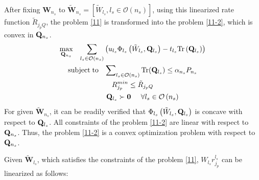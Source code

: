 \documentclass[12pt,onecolumn,tworows]{IEEEtran}
\begin{document}
After fixing $\mathbf{W}_{n_s}$ to $\mathbf{\tilde W}_{n_s} = [\tilde W_{l_s},l_s\in\mathcal{O}(n_s)]$, using this linearized rate function ${{\tilde R}_{{j_pQ}}}$, the problem \eqref{11} is transformed into the problem \eqref{11-2}, which is convex in ${\bf{Q}}_{{n_s}}$.
\begin{equation}\label{11-2}
\begin{gathered}
{\max _{{{\bf{Q}}_{{n_s}}}}}\;\;\;\sum\limits_{{l_s} \in {\cal O}\left( {{n_s}} \right)} {\left( {{u_{{l_s}}}{\Phi _{{l_s}}}\left( {{{{{\tilde W}}}_{{l_s}}},{{\bf{Q}}_{{l_s}}}} \right) - {t_{{l_s}}}{\rm{Tr}}\left( {{{\bf{Q}}_{{l_s}}}} \right)} \right)} \\
{\rm{subject}}\;{\rm{to}}\;\;\;\sum\nolimits_{{l_s} \in {\cal O}\left( {{n_s}} \right)} {{\rm{Tr}}({{\bf{Q}}_{{l_s}}})}  \le {\alpha _{{n_s}}}{P_{{n_s}}}\\
R_{{j_p}}^{min} \le {{ \tilde{R}}_{{j_pQ}}}\\
\;\;\;\;\;\;\;\;\;\;{{\bf{Q}}_{{l_s}}} \succ {\bf{0}}\;\;\;\;\;\forall {l_s} \in {\cal O}\left( {{n_s}} \right)
\end{gathered}
\end{equation}
For given $\mathbf{\tilde W}_{n_s}$,  it can be readily verified that
${\Phi _{{l_s}}}\left( {{{{{\tilde W}}}_{{l_s}}},{{\bf{Q}}_{{l_s}}}} \right)$ is concave with respect to
 ${{\bf{Q}}_{{l_s}}}$. All constraints of the problem \eqref{11-2} are linear with respect to
 ${{\bf{Q}}_{{n_s}}}$. Thus, the problem \eqref{11-2} is a convex optimization problem with respect to
 ${{\bf{Q}}_{{n_s}}}$.



Given $\tilde{\mathbf{W}}_{l_s}$, which satisfies the constraints of the problem \eqref{11},  ${W_{{l_s}}}r_{{j_p}}^{{l_s}}$ can be linearized as follows:
\end{document}
